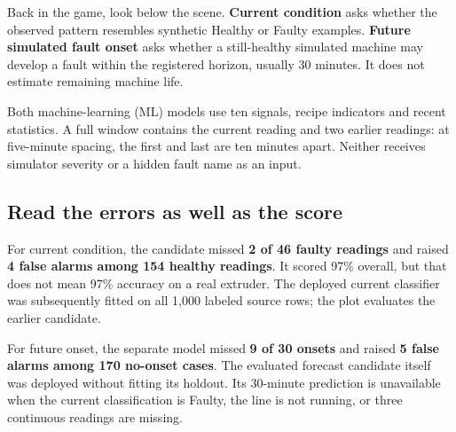 Back in the game, look below the scene. \textbf{Current condition} asks whether the observed pattern resembles synthetic Healthy or Faulty examples. \textbf{Future simulated fault onset} asks whether a still-healthy simulated machine may develop a fault within the registered horizon, usually 30 minutes. It does not estimate remaining machine life.

Both machine-learning (ML) models use ten signals, recipe indicators and recent statistics. A full window contains the current reading and two earlier readings: at five-minute spacing, the first and last are ten minutes apart. Neither receives simulator severity or a hidden fault name as an input.

\subsection*{Read the errors as well as the score}

For current condition, the candidate missed \textbf{2 of 46 faulty readings} and raised \textbf{4 false alarms among 154 healthy readings}. It scored 97\% overall, but that does not mean 97\% accuracy on a real extruder. The deployed current classifier was subsequently fitted on all 1,000 labeled source rows; the plot evaluates the earlier candidate.

For future onset, the separate model missed \textbf{9 of 30 onsets} and raised \textbf{5 false alarms among 170 no-onset cases}. The evaluated forecast candidate itself was deployed without fitting its holdout. Its 30-minute prediction is unavailable when the current classification is Faulty, the line is not running, or three continuous readings are missing.

